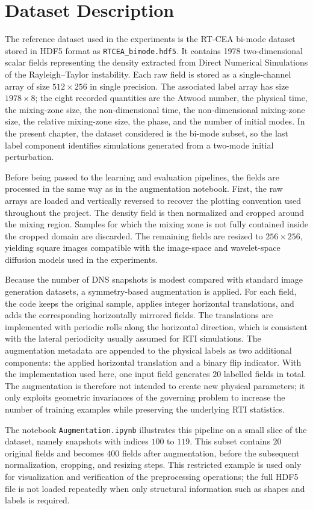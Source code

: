\section{Dataset Description}

The reference dataset used in the experiments is the RT-CEA bi-mode dataset
stored in HDF5 format as \texttt{RTCEA\_bimode.hdf5}. It contains
1978 two-dimensional scalar fields representing the density extracted
from Direct Numerical Simulations of the Rayleigh--Taylor instability. Each
raw field is stored as a single-channel array of size \(512 \times 256\) in
single precision. The associated label array has size \(1978 \times 8\);
the eight recorded quantities are the Atwood number, the physical time, the
mixing-zone size, the non-dimensional time, the non-dimensional mixing-zone
size, the relative mixing-zone size, the phase, and the number of initial
modes. In the present chapter, the dataset considered is the bi-mode subset,
so the last label component identifies simulations generated from a two-mode
initial perturbation.

Before being passed to the learning and evaluation pipelines, the fields are
processed in the same way as in the augmentation notebook. First, the raw
arrays are loaded and vertically reversed to recover the plotting convention
used throughout the project. The density field is then normalized and cropped
around the mixing region. Samples for which the mixing zone is not fully
contained inside the cropped domain are discarded. The remaining fields are
resized to \(256 \times 256\), yielding square images compatible with the
image-space and wavelet-space diffusion models used in the experiments.

Because the number of DNS snapshots is modest compared with standard image
generation datasets, a symmetry-based augmentation is applied. For each field,
the code keeps the original sample, applies integer horizontal translations,
and adds the corresponding horizontally mirrored fields. The translations are
implemented with periodic rolls along the horizontal direction, which is
consistent with the lateral periodicity usually assumed for RTI simulations.
The augmentation metadata are appended to the physical labels as two additional
components: the applied horizontal translation and a binary flip indicator.
With the implementation used here, one input field generates \(20\) labelled
fields in total. The augmentation is therefore not intended to create new
physical parameters; it only exploits geometric invariances of the governing
problem to increase the number of training examples while preserving the
underlying RTI statistics.

The notebook \texttt{Augmentation.ipynb} illustrates this pipeline on a small
slice of the dataset, namely snapshots with indices \(100\) to \(119\). This
subset contains \(20\) original fields and becomes \(400\) fields after
augmentation, before the subsequent normalization, cropping, and resizing
steps. This restricted example is used only for visualization and verification
of the preprocessing operations; the full HDF5 file is not loaded repeatedly
when only structural information such as shapes and labels is required.
